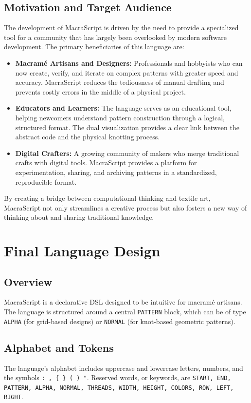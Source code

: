 \documentclass[12pt,a4paper]{report}
\begin{document}
\section{Motivation and Target Audience}
The development of MacraScript is driven by the need to provide a specialized tool for a community that has largely been overlooked by modern software development. The primary beneficiaries of this language are:
\begin{itemize}
    \item \textbf{Macramé Artisans and Designers:} Professionals and hobbyists who can now create, verify, and iterate on complex patterns with greater speed and accuracy. MacraScript reduces the tediousness of manual drafting and prevents costly errors in the middle of a physical project.
    \item \textbf{Educators and Learners:} The language serves as an educational tool, helping newcomers understand pattern construction through a logical, structured format. The dual visualization provides a clear link between the abstract code and the physical knotting process.
    \item \textbf{Digital Crafters:} A growing community of makers who merge traditional crafts with digital tools. MacraScript provides a platform for experimentation, sharing, and archiving patterns in a standardized, reproducible format.
\end{itemize}
By creating a bridge between computational thinking and textile art, MacraScript not only streamlines a creative process but also fosters a new way of thinking about and sharing traditional knowledge.

\chapter{Final Language Design}

\section{Overview}
MacraScript is a declarative DSL designed to be intuitive for macramé artisans. The language is structured around a central \texttt{PATTERN} block, which can be of type \texttt{ALPHA} (for grid-based designs) or \texttt{NORMAL} (for knot-based geometric patterns).

\section{Alphabet and Tokens}
The language's alphabet includes uppercase and lowercase letters, numbers, and the symbols \texttt{: , \{ \} ( ) "}. Reserved words, or keywords, are \texttt{START, END, PATTERN, ALPHA, NORMAL, THREADS, WIDTH, HEIGHT, COLORS, ROW, LEFT, RIGHT}.
\end{document}
